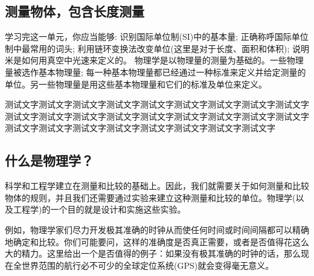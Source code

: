 \begin{Project}

\section{测量物体，包含长度测量}

\begin{Point*}
	学习完这一单元，你应当能够: 识别国际单位制(SI)中的基本量; 正确称呼国际单位制中最常用的词头; 利用链环变换法改变单位(这里是对于长度、面积和体积); 说明米是如何用真空中光速来定义的。
	\tcblower
	物理学是以物理量的测量为基础的。一些物理量被选作基本物理量; 每一种基本物理量都已经通过一种标准来定义并给定测量的单位。另一些物理量是用这些基本物理量和它们的标准及单位来定义。
%	
%	
%
\end{Point*}

测试文字测试文字测试文字测试文字测试文字测试文字测试文字测试文字测试文字测试文字测试文字测试文字测试文字测试文字测试文字测试文字测试文字测试文字测试文字测试文字测试文字测试文字测试文字测试文字测试文字测试文字
\makeatletter
\makeatother


%



\begin{Paracol}
	\subsection{什么是物理学？}

	
	科学和工程学建立在测量和比较的基础上。因此，我们就需要关于如何测量和比较物体的规则，并且我们还需要通过实验来建立这种测量和比较的单位。物理学(以及工程学)的一个目的就是设计和实施这些实验。
	
	例如，物理学家们尽力开发极其准确的时钟从而使任何时间或时间间隔都可以精确地确定和比较。你们可能要问，这样的准确度是否真正需要，或者是否值得花这么大的精力。这里给出一个是否值得的例子：如果没有极其准确的时钟的话，那么现在全世界范围的航行必不可少的全球定位系统(GPS)就会变得毫无意义。
	

\end{Paracol}
\end{Project}
